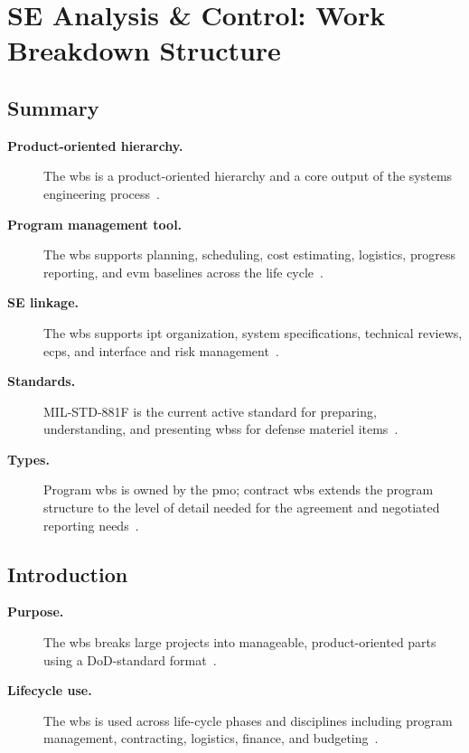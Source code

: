 \documentclass[../main.tex]{subfiles}
\begin{document}
\section{SE Analysis \& Control: Work Breakdown Structure}

\subsection{Summary}
\begin{description}
  \item[\textbf{Product-oriented hierarchy.}] The \ac{wbs} is a product-oriented hierarchy and a core output of the systems engineering process~\autocite{edo-3-5-2-wbs-2025}.
  \item[\textbf{Program management tool.}] The \ac{wbs} supports planning, scheduling, cost estimating, logistics, progress reporting, and \ac{evm} baselines across the life cycle~\autocite{edo-3-5-2-wbs-2025}.
  \item[\textbf{SE linkage.}] The \ac{wbs} supports \ac{ipt} organization, system specifications, technical reviews, \acp{ecp}, and interface and risk management~\autocite{edo-3-5-2-wbs-2025}.
  \item[\textbf{Standards.}] MIL-STD-881F is the current active standard for preparing, understanding, and presenting \acp{wbs} for defense materiel items~\autocite{edo-3-5-2-wbs-2025,MILSTD-881F}.
  \item[\textbf{Types.}] Program \ac{wbs} is owned by the \ac{pmo}; contract \ac{wbs} extends the program structure to the level of detail needed for the agreement and negotiated reporting needs~\autocite{edo-3-5-2-wbs-2025,MILSTD-881F}.
\end{description}

\subsection{Introduction}
\begin{description}
  \item[\textbf{Purpose.}] The \ac{wbs} breaks large projects into manageable, product-oriented parts using a DoD-standard format~\autocite{edo-3-5-2-wbs-2025,MILSTD-881F}.
  \item[\textbf{Lifecycle use.}] The \ac{wbs} is used across life-cycle phases and disciplines including program management, contracting, logistics, finance, and budgeting~\autocite{edo-3-5-2-wbs-2025}.
\end{description}
\end{document}
